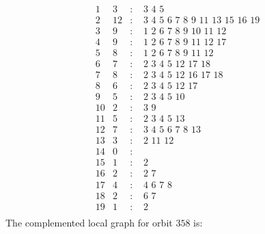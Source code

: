 \documentclass[12pt]{article}
\begin{document}
\begin{equation*}
\begin{array}{rrcl}
1&3&:&\,\,3\,\,4\,\,5\\
2&12&:&\,\,3\,\,4\,\,5\,\,6\,\,7\,\,8\,\,9\,\,11\,\,13\,\,15\,\,16\,\,19\\
3&9&:&\,\,1\,\,2\,\,6\,\,7\,\,8\,\,9\,\,10\,\,11\,\,12\\
4&9&:&\,\,1\,\,2\,\,6\,\,7\,\,8\,\,9\,\,11\,\,12\,\,17\\
5&8&:&\,\,1\,\,2\,\,6\,\,7\,\,8\,\,9\,\,11\,\,12\\
6&7&:&\,\,2\,\,3\,\,4\,\,5\,\,12\,\,17\,\,18\\
7&8&:&\,\,2\,\,3\,\,4\,\,5\,\,12\,\,16\,\,17\,\,18\\
8&6&:&\,\,2\,\,3\,\,4\,\,5\,\,12\,\,17\\
9&5&:&\,\,2\,\,3\,\,4\,\,5\,\,10\\
10&2&:&\,\,3\,\,9\\
11&5&:&\,\,2\,\,3\,\,4\,\,5\,\,13\\
12&7&:&\,\,3\,\,4\,\,5\,\,6\,\,7\,\,8\,\,13\\
13&3&:&\,\,2\,\,11\,\,12\\
14&0&:&\\
15&1&:&\,\,2\\
16&2&:&\,\,2\,\,7\\
17&4&:&\,\,4\,\,6\,\,7\,\,8\\
18&2&:&\,\,6\,\,7\\
19&1&:&\,\,2\\
\end{array}
\end{equation*}
The complemented local graph for orbit $358$ is:
\end{document}
